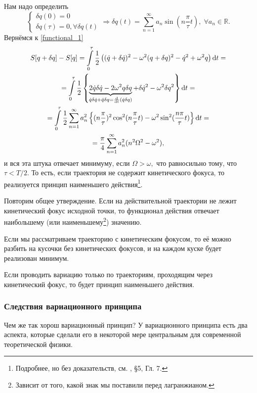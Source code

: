 Нам надо определить
\begin{equation}
\begin{cases}
\delta q(0) =0\\
\delta q(\tau) = 0,
\forall \delta q(t)
\end{cases}
\Rightarrow \delta q(t) = \sum_{n=1}^\infty a_n \sin \left(n \frac{\pi}{\tau} t \right), \; \forall a_n \in \mathbb{R}.
\end{equation}
Вернёмся к \eqref{functional_1}
\begin{gather}
S[q+\delta q] - S[q] = \int\limits_0^\tau \frac{1}{2} \left( (\dot{q} + \delta \dot{q})^2 - \omega^2 (q +\delta q)^2  - \dot{q}^2 + \omega^2 q\right) \dd{t} =\\
=\int\limits_0^\tau \frac{1}{2} \left\lbrace \underbrace{2\dot{q} \delta \dot{q} - 2\omega^2 q \delta q}_{\dot{q}\delta \dot{q} + \ddot{q} \delta q = \dv{t}(\dot{q} \delta q)} + \delta \dot{q}^2 - \omega^2 \delta q^2 \right\rbrace \dd{t} =\\
= \int\limits_0^\tau \frac{1}{2} \sum_{n=1}^\infty a_n^2  \left\lbrace (n \frac{\pi}{\tau})^2 \cos^2 (n \frac{\pi}{\tau} t) - \omega^2 \sin^2 (\frac{n \pi}{\tau} t) \right\rbrace \dd{t} =\\
= \frac{\pi}{4} \sum_{n=1}^\infty a_n^2 (n^2 \Omega^2 - \omega^2), 
 \end{gather}
 и вся эта штука отвечает минимуму, если $\Omega > \omega,$ что равносильно тому, что $\tau < T/2.$ То есть, если траектория не содержит кинетического фокуса, то реализуется принцип наименьшего действия\footnote{Подробнее, но без доказательств, см. \cite{Atherman}, \S 5, Гл. 7.}.

Повторим общее утверждение. Если на действительной траектории не лежит кинетический фокус исходной точки, то функционал действия отвечает наибольшему (или наименьшему\footnote{Зависит от того, какой знак мы поставили перед лагранжианом.}) значению.

Если мы рассматриваем траекторию с кинетическим фокусом, то её можно разбить на кусочки без кинетических фокусов, и на каждом куске будет реализован минимум.

Если проводить вариацию только по траекториям, проходящим через кинетический фокус, то будет принцип наименьшего действия.

\subsubsection{Следствия вариационного принципа}
Чем же так хорош вариационный принцип?
У вариационного принципа есть два аспекта, которые сделали его в некоторой мере центральным для современной теоретической физики.

